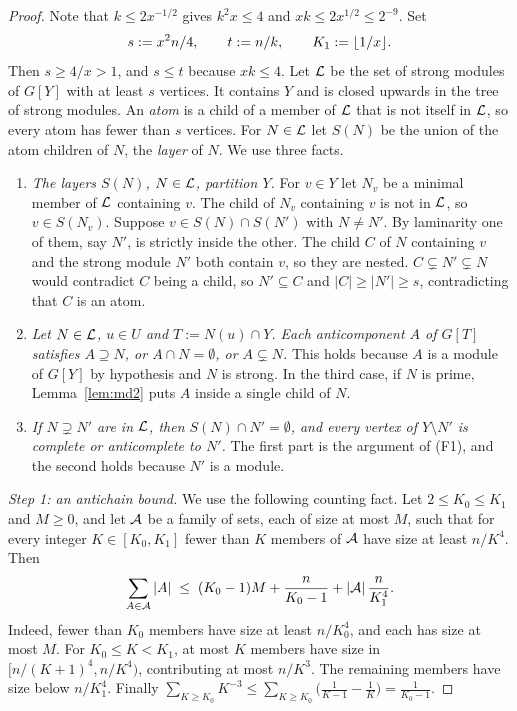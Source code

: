 \begin{proof}
Note that $k\le2x^{-1/2}$ gives $k^2x\le4$ and $xk\le2x^{1/2}\le2^{-9}$. Set
\[
s:=x^2n/4,\qquad t:=n/k,\qquad K_1:=\lfloor 1/x\rfloor.
\]
Then $s\ge4/x>1$, and $s\le t$ because $xk\le4$. Let $\mathcal{L}$ be the set of strong modules of $G[Y]$ with at
least $s$ vertices. It contains $Y$ and is closed upwards in the tree of strong modules. An \emph{atom} is
a child of a member of $\mathcal{L}$ that is not itself in $\mathcal{L}$, so every atom has fewer than $s$ vertices. For
$N\in\mathcal{L}$ let $S(N)$ be the union of the atom children of $N$, the \emph{layer} of $N$. We use three facts.

\begin{enumerate}[label=(F\arabic*),leftmargin=2.5em]
\item \emph{The layers $S(N)$, $N\in\mathcal{L}$, partition $Y$.} For $v\in Y$ let $N_v$ be a minimal member of
  $\mathcal{L}$ containing $v$. The child of $N_v$ containing $v$ is not in $\mathcal{L}$, so $v\in S(N_v)$. Suppose $v\in
  S(N)\cap S(N')$ with $N\neq N'$. By laminarity one of them, say $N'$, is strictly inside the other.
  The child $C$ of $N$ containing $v$ and the strong module $N'$ both contain $v$, so they are nested.
  $C\subsetneq N'\subsetneq N$ would contradict $C$ being a child, so $N'\subseteq C$ and $|C|\ge|N'|\ge s$,
  contradicting that $C$ is an atom.
\item \emph{Let $N\in\mathcal{L}$, $u\in U$ and $T:=N(u)\cap Y$. Each anticomponent $A$ of $G[T]$ satisfies
  $A\supseteq N$, or $A\cap N=\emptyset$, or $A\subsetneq N$.} This holds because $A$ is a module of $G[Y]$
  by hypothesis and $N$ is strong. In the third case, if $N$ is prime, Lemma~\ref{lem:md2} puts $A$ inside
  a single child of $N$.
\item \emph{If $N\supsetneq N'$ are in $\mathcal{L}$, then $S(N)\cap N'=\emptyset$, and every vertex of $Y\setminus
  N'$ is complete or anticomplete to $N'$.} The first part is the argument of (F1), and the second holds
  because $N'$ is a module.
\end{enumerate}

\emph{Step 1: an antichain bound.} We use the following counting fact. Let $2\le K_0\le K_1$ and $M\ge0$,
and let $\mathcal{A}$ be a family of sets, each of size at most $M$, such that for every integer
$K\in[K_0,K_1]$ fewer than $K$ members of $\mathcal{A}$ have size at least $n/K^4$. Then
\begin{equation}\label{eq:antichain}
\sum_{A\in\mathcal{A}}|A|\;\le\;(K_0-1)M+\frac{n}{K_0-1}+|\mathcal{A}|\,\frac{n}{K_1^4}.
\end{equation}
Indeed, fewer than $K_0$ members have size at least $n/K_0^4$, and each has size at most $M$. For
$K_0\le K<K_1$, at most $K$ members have size in $[n/(K+1)^4,n/K^4)$, contributing at most $n/K^3$. The
remaining members have size below $n/K_1^4$. Finally $\sum_{K\ge K_0}K^{-3}\le\sum_{K\ge
K_0}\bigl(\frac1{K-1}-\frac1K\bigr)=\frac1{K_0-1}$.


\end{proof}
